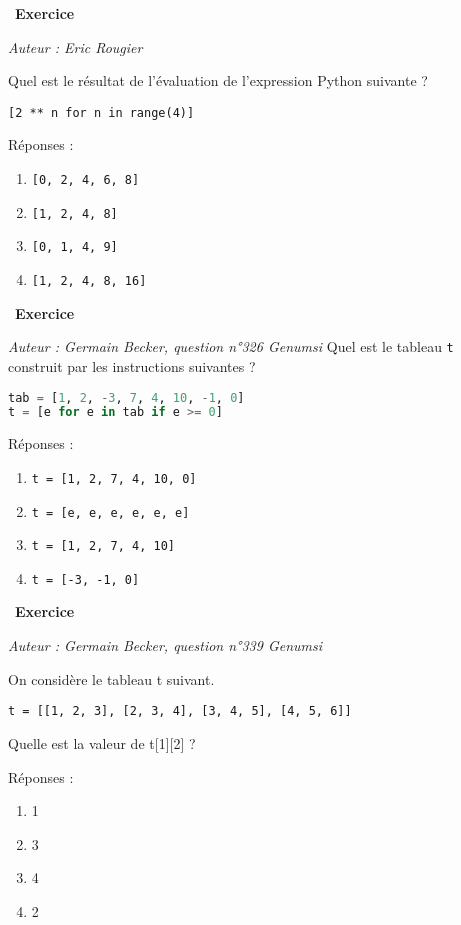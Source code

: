 \documentclass[
  11pt,
]{article}
\newcommand{\passthrough}[1]{#1}
\providecommand{\tightlist}{%
  \setlength{\itemsep}{0pt}\setlength{\parskip}{0pt}}
\newcounter{exo}
\newenvironment{exercice}[1]
{\par \medskip   \addtocounter{exo}{1} \noindent  
\begin{bclogo}[arrondi =0.1,   noborder = true, logo=\bccrayon, marge=4]{~\textbf{Exercice} \textbf{\theexo} {\itshape #1} }  \par}
{
\end{bclogo}
 \par \bigskip }
\newcounter{def}
\begin{document}
\begin{exercice}{}

\emph{Auteur : Eric Rougier}

Quel est le résultat de l'évaluation de l'expression Python suivante ?

\passthrough{\lstinline![2 ** n for n in range(4)]!}

Réponses :

\begin{enumerate}
\def\labelenumi{\arabic{enumi}.}
\tightlist
\item
  \passthrough{\lstinline![0, 2, 4, 6, 8]!}
\item
  \passthrough{\lstinline![1, 2, 4, 8]!}
\item
  \passthrough{\lstinline![0, 1, 4, 9]!}
\item
  \passthrough{\lstinline![1, 2, 4, 8, 16]!}
\end{enumerate}

\end{exercice}

\begin{exercice}{}

\emph{Auteur : Germain Becker, question n°326 Genumsi} Quel est le
tableau \passthrough{\lstinline!t!} construit par les instructions
suivantes ?

\begin{lstlisting}[language=Python]
tab = [1, 2, -3, 7, 4, 10, -1, 0]
t = [e for e in tab if e >= 0]
\end{lstlisting}

Réponses :

\begin{enumerate}
\def\labelenumi{\arabic{enumi}.}
\tightlist
\item
  \passthrough{\lstinline!t = [1, 2, 7, 4, 10, 0]!}
\item
  \passthrough{\lstinline!t = [e, e, e, e, e, e]!}
\item
  \passthrough{\lstinline!t = [1, 2, 7, 4, 10]!}
\item
  \passthrough{\lstinline!t = [-3, -1, 0]!}
\end{enumerate}

\end{exercice}

\begin{exercice}{}

\emph{Auteur : Germain Becker, question n°339 Genumsi}

On considère le tableau t suivant.

\passthrough{\lstinline!t = [[1, 2, 3], [2, 3, 4], [3, 4, 5], [4, 5, 6]]!}

Quelle est la valeur de t{[}1{]}{[}2{]} ?

Réponses :

\begin{enumerate}
\def\labelenumi{\arabic{enumi}.}
\tightlist
\item
  1
\item
  3
\item
  4
\item
  2
\end{enumerate}

\end{exercice}
\end{document}
